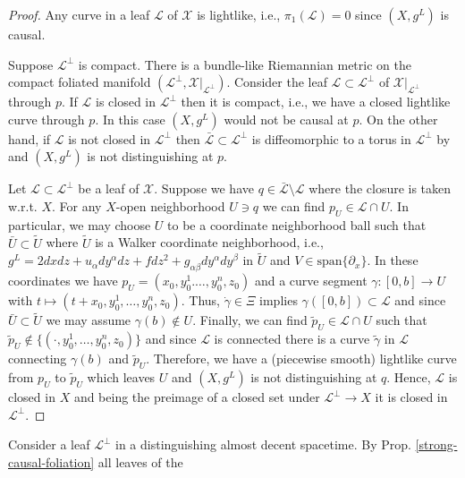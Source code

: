 \documentclass[a4paper,10pt,twoside]{amsart}
\theoremstyle{definition}
\theoremstyle{remark}
\numberwithin{equation}{section}
\begin{document}
\begin{proof}
	Any curve in a leaf $\mathcal{L}$ of $\mathcal{X}$ is lightlike, i.e., $\pi_{1}(\mathcal{L})=0$ since $(X,g^{L})$ is causal.\par
	Suppose $\mathcal{L}^{\perp}$ is compact. There is a bundle-like Riemannian metric on the compact foliated manifold
	$(\mathcal{L}^{\perp},\mathcal{X}|_{\mathcal{L}^{\perp}})$. Consider the leaf $\mathcal{L} \subset \mathcal{L}^{\perp}$ of
	$\mathcal{X}|_{\mathcal{L}^{\perp}}$ through $p$. If $\mathcal{L}$ is closed in $\mathcal{L}^{\perp}$ then it is compact, i.e., we have a
	closed lightlike curve through $p$. In this case $(X,g^{L})$ would not be causal at $p$. On the other hand, if $\mathcal{L}$ is not closed
	in $\mathcal{L}^{\perp}$ then $\bar{\mathcal{L}} \subset \mathcal{L}^{\perp}$ is diffeomorphic to a torus in $\mathcal{L}^{\perp}$
	by \cite{MR744829} and $(X,g^{L})$ is not distinguishing at $p$.\par
	Let $\mathcal{L} \subset \mathcal{L}^{\perp}$ be a leaf of $\mathcal{X}$. Suppose we have $q \in \bar{\mathcal{L}} \setminus \mathcal{L}$
	where the closure is taken w.r.t. $X$. For any $X$-open neighborhood $U \ni q$ we can find $p_{U} \in \mathcal{L} \cap U$. In particular,
	we may choose $U$ to be a coordinate neighborhood ball such that $\bar{U} \subset \tilde{U}$ where $\tilde{U}$ is a Walker coordinate
	neighborhood, i.e., $g^{L}= 2dxdz+ u_{\alpha}dy^{\alpha}dz + fdz^{2} + g_{\alpha\beta}dy^{\alpha}dy^{\beta}$ in $\tilde{U}$ and
	$V \in \mbox{span}\{\partial_{x}\}$. In these coordinates we have $p_{U}=(x_{0},y^{1}_{0}.\ldots,y^{n}_{0},z_{0})$
	and a curve segment $\gamma:[0,b] \rightarrow U$ with $t \mapsto (t+x_{0},y^{1}_{0},\ldots,y^{n}_{0},z_{0})$. Thus, $\dot{\gamma} \in \Xi$
	implies $\gamma([0,b]) \subset \mathcal{L}$ and since $\bar{U} \subset \tilde{U}$ we may assume $\gamma(b) \notin U$. Finally, we can find
	$\tilde{p}_{U} \in \mathcal{L} \cap U$ such that $\tilde{p}_{U} \notin \{(\cdot,y^{1}_{0},\ldots,y^{n}_{0},z_{0})\}$ and since
	$\mathcal{L}$ is connected there is a curve $\tilde{\gamma}$ in $\mathcal{L}$ connecting $\gamma(b)$ and $\tilde{p}_{U}$.
	Therefore, we have a (piecewise smooth) lightlike curve from $p_{U}$ to $\tilde{p}_{U}$ which leaves $U$ and $(X,g^{L})$ is not
	distinguishing at $q$.
	Hence, $\mathcal{L}$ is closed in $X$ and being the preimage of a closed set under $\mathcal{L}^{\perp} \rightarrow X$ it is closed
	in $\mathcal{L}^{\perp}$.
\end{proof}
Consider a leaf $\mathcal{L}^{\perp}$ in a distinguishing almost decent spacetime. By Prop. \ref{strong-causal-foliation} all leaves of the
\end{document}
